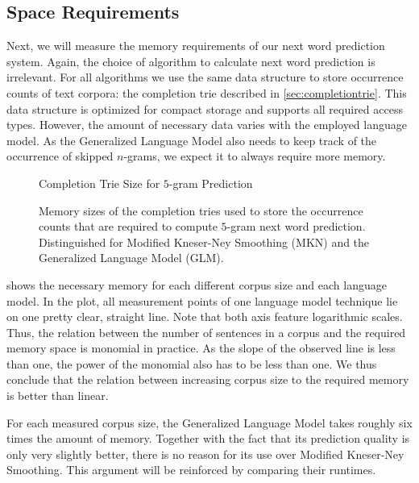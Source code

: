 \subsection{Space Requirements}
\label{subsec:evaluation-topkjoin-space}

Next, we will measure the memory requirements of our next word prediction
system.
Again, the choice of algorithm to calculate next word prediction is irrelevant.
For all algorithms we use the same data structure to store occurrence counts of
text corpora: the completion trie described in \cref{sec:completiontrie}.
This data structure is optimized for compact storage and supports all required
access types.
However, the amount of necessary data varies with the employed language model.
As the Generalized Language Model also needs to keep track of the occurrence
of skipped $n$-grams, we expect it to always require more memory.

\begin{figure}
  \centering
  Completion Trie Size for $5$-gram Prediction
  \\[1.5ex]
  \begin{minipage}{0.7\textwidth}
    \centering
    
  \end{minipage}
  \caption{Memory sizes of the completion tries used to store the occurrence
    counts that are required to compute $5$-gram next word prediction.
    Distinguished for Modified Kneser-Ney Smoothing (MKN) and the Generalized
    Language Model (GLM).}
  \label{fig:evaluation-trie-size}
\end{figure}

 shows the necessary memory for each different
corpus size and each language model.
In the plot, all measurement points of one language model technique lie on one
pretty clear, straight line.
Note that both axis feature logarithmic scales.
Thus, the relation between the number of sentences in a corpus and the required
memory space is monomial in practice.
As the slope of the observed line is less than one, the power of the monomial
also has to be less than one.
We thus conclude that the relation between increasing corpus size to the
required memory is better than linear.

For each measured corpus size, the Generalized Language Model takes roughly
six times the amount of memory.
Together with the fact that its prediction quality is only very slightly better,
there is no reason for its use over Modified Kneser-Ney Smoothing.
This argument will be reinforced by comparing their runtimes.

